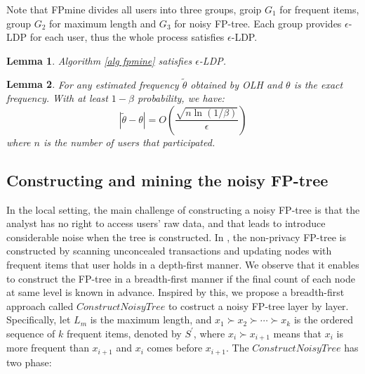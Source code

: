 \documentclass[conference]{IEEEtran}
\newtheorem{lemma}{Lemma}[section]
\newtheorem*{proof}{\text{$Proof.$}}
\begin{document}
Note that FPmine divides all users into three groups, groip $G_1$ for frequent items, group $G_2$ for maximum length and $G_3$ for noisy FP-tree. Each group provides $\epsilon$-LDP for each user, thus the whole process satisfies $\epsilon$-LDP.

\begin{lemma}
Algorithm \ref{alg fpmine} satisfies $\epsilon$-LDP.
\end{lemma}


\begin{lemma}\label{olh error}
For any estimated frequency $\tilde{\theta}$ obtained by OLH and $\theta$ is the exact frequency. With at least $1-\beta$ probability, we have:
$$|\tilde{\theta} - \theta | = O \left(\frac{\sqrt{n\ln{(1/\beta)}}}{\epsilon} \right)$$
where $n$ is the number of users that participated.
\end{lemma}

\subsection{Constructing and mining the noisy FP-tree}
\label{construct and mine}
In the local setting, the main challenge of constructing a noisy FP-tree is that the analyst has no right to access users' raw data, and that leads to introduce considerable noise when the tree is constructed. In \cite{fp}, the non-privacy FP-tree is constructed by scanning unconcealed transactions and {\color{red}updating nodes with frequent items that user holds in a depth-first manner}. We observe that it enables to construct the FP-tree in a breadth-first manner if the final count of each node at same level is known in advance. Inspired by this, we propose a breadth-first approach {\color{red}called $ConstructNoisyTree$} to costruct a noisy FP-tree layer by layer. Specifically, let $L_m$ is the maximum length, and $x_1 \succ x_2 \succ \cdots  \succ x_k$ is the ordered sequence of $k$ frequent items, denoted by $S^{\prime}$, where $x_i \succ x_{i+1}$ means that $x_i$ is more frequent than $x_{i+1}$ and $x_i$ comes before $x_{i+1}$. The {\color{red} $ConstructNoisyTree$} has two phase:
\end{document}
